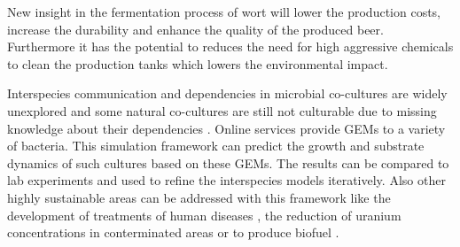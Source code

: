 
New insight in the fermentation process of wort will lower the production costs, increase the durability and enhance the quality of the
produced beer. Furthermore it has the potential to reduces the need for high aggressive chemicals to clean the production tanks which
lowers the environmental impact.



Interspecies communication and dependencies in microbial co-cultures are widely unexplored and some natural co-cultures are still not
culturable due to missing knowledge about their dependencies \cite{d2010siderophores}. Online services provide GEMs to a variety of bacteria.
This simulation framework can predict the growth and substrate dynamics of such cultures based on these GEMs. The results can be compared to
lab experiments and used to refine the interspecies models iteratively. Also other highly sustainable areas can be addressed with this
framework like the development of treatments of human diseases \cite{ZOMORRODI2016837}, the reduction of uranium concentrations in
conterminated areas \cite{zhuang2011genome} or to produce biofuel \cite{hanly2011dynamic} \cite{chiu2014emergent}.

